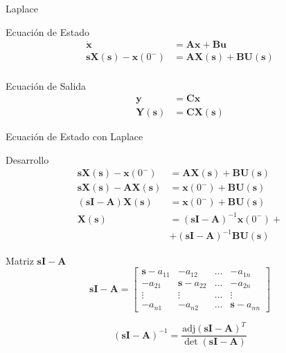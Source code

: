 \documentclass[xcolor={usenames,svgnames,dvipsnames}]{beamer}
\newcommand{\laplace}[1]{\mathbf{#1}(\mathbf{s})}
\newcommand{\slp}{\mathbf{s}}
\begin{document}
\begin{frame}[label={sec:orgecedebc}]{Laplace}
\begin{block}{Ecuación de Estado}
\begin{align*}
  \dot{\mathbf{x}} &= \mathbf{A}\mathbf{x} + \mathbf{B}\mathbf{u}\\
  \slp \laplace{X} - \mathbf{x}(0^-) &= \mathbf{A}\laplace{X} + \mathbf{B}\laplace{U}\\
\end{align*}
\end{block}
\begin{block}{Ecuación de Salida}
\begin{align*}
  \mathbf{y} &= \mathbf{C}\mathbf{x}\\
  \laplace{Y} &= \mathbf{C}\laplace{X}
\end{align*}
\end{block}
\end{frame}
\begin{frame}[label={sec:orga994ed8}]{Ecuación de Estado con Laplace}
\begin{block}{Desarrollo}
\begin{align*}
  \slp \laplace{X} - \mathbf{x}(0^-) &= \mathbf{A}\laplace{X} + \mathbf{B}\laplace{U}\\
  \slp \laplace{X} - \mathbf{A}\laplace{X} &= \mathbf{x}(0^-) + \mathbf{B}\laplace{U}\\
  \left(\slp \mathbf{I} - \mathbf{A} \right) \laplace{X} &= \mathbf{x}(0^-) + \mathbf{B}\laplace{U}\\
  \laplace{X} &= \left(\slp \mathbf{I} - \mathbf{A} \right)^{-1} \mathbf{x}(0^-) +\\ 
  &+ \left(\slp \mathbf{I} - \mathbf{A} \right)^{-1} \mathbf{B}\laplace{U}
\end{align*}
\end{block}
\end{frame}

\begin{frame}[label={sec:org7b05701}]{Matriz \(\slp \mathbf{I} - \mathbf{A}\)}
\[
\slp \mathbf{I} - \mathbf{A} = 
\begin{bmatrix} 
\slp - a_{11} & -a_{12} & \dots & -a_{1n}\\
- a_{21} & \slp -a_{22} & \dots & -a_{2n}\\
\vdots & \vdots & \dots & \vdots \\
- a_{n1} & -a_{n2} & \dots & \slp - a_{nn}
\end{bmatrix}
\]

\[
\left(\slp \mathbf{I} - \mathbf{A} \right)^{-1} = \frac{\text{adj}(\slp \mathbf{I} - \mathbf{A})^T}{\det(\slp \mathbf{I} - \mathbf{A})}
\]
\end{frame}
\end{document}
